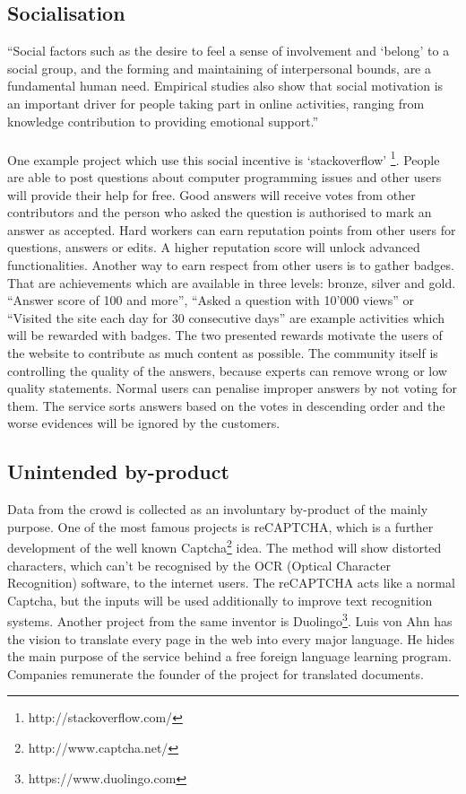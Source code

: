 \subsection{Socialisation}
``Social factors such as the desire to feel a sense of involvement and `belong' to a social group, and the forming and maintaining of interpersonal bounds, are a fundamental human need. Empirical studies also show that social motivation is an important driver for people taking part in online activities, ranging from knowledge contribution to providing emotional support.'' \cite{yu} \\
\\
One example project which use this social incentive is `stackoverflow' \footnote{http://stackoverflow.com/}. People are able to post questions about computer programming issues and other users will provide their help for free. Good answers will receive votes from other contributors and the person who asked the question is authorised to mark an answer as accepted. Hard workers can earn reputation points from other users for questions, answers or edits. A higher reputation score will unlock advanced functionalities. Another way to earn respect from other users is to gather badges. That are achievements which are available in three levels: bronze, silver and gold. ``Answer score of 100 and more'', ``Asked a question with 10'000 views'' or ``Visited the site each day for 30 consecutive days'' are example activities which will be rewarded with badges. The two presented rewards motivate the users of the website to contribute as much content as possible. The community itself is controlling the quality of the answers, because experts can remove wrong or low quality statements. Normal users can penalise improper answers by not voting for them. The service sorts answers based on the votes in descending order and the worse evidences will be ignored by the customers.

\subsection{Unintended by-product}
Data from the crowd is collected as an involuntary by-product of the mainly purpose. One of the most famous projects is reCAPTCHA\cite{recaptcha}, which is a further development of the well known Captcha\footnote{http://www.captcha.net/} idea. The method will show distorted characters,  which can't be recognised by the OCR (Optical Character Recognition) software, to the internet users. The reCAPTCHA acts like a normal Captcha, but the inputs will be used additionally to improve text recognition systems. 
Another project from the same inventor is Duolingo\footnote{https://www.duolingo.com}. Luis von Ahn has the vision to translate every page in the web into every major language. He hides the main purpose of the service behind a free foreign language learning program. Companies remunerate the founder of the project for translated documents.

